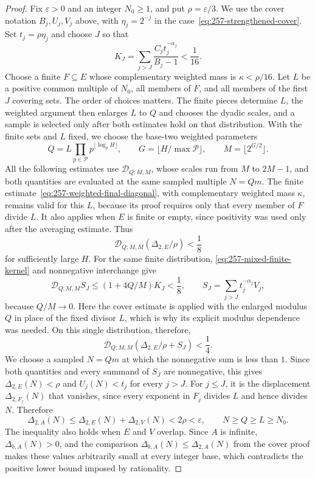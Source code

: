 \documentclass[11pt]{article}
\theoremstyle{plain}
\theoremstyle{definition}
\theoremstyle{remark}
\begin{document}
\begin{proof}
Fix $\varepsilon>0$ and an integer $N_0\ge1$, and put $\rho=\varepsilon/3$.
We use the cover notation $B_j,U_j,V_j$ above, with $\eta_j=2^{-j}$ in
the case~\eqref{eq:257-strengthened-cover}.  Set $t_j=\rho\eta_j$ and choose
$J$ so that
\[
 K_J=\sum_{j>J}\frac{C_jt_j^{-\alpha_j}}{B_j-1}<\frac1{16}.
\]
Choose a finite $F\subseteq E$ whose complementary weighted mass is
$\kappa<\rho/16$.  Let $L$ be a positive common multiple of $N_0$, all
members of $F$, and all members of the first $J$ covering sets. The order
of choices matters. The finite pieces determine $L$, the weighted
argument then enlarges $L$ to $Q$ and chooses the dyadic scales, and a
sample is selected only after both estimates hold on that distribution.
With the finite sets and $L$ fixed, we choose the base-two weighted
parameters
\[
 Q=L\prod_{p\in\mathcal P}p^{\lfloor\log_pH\rfloor},\qquad
 G=\lfloor H/\max\mathcal P\rfloor,\qquad M=\lfloor2^{G/2}\rfloor.
\]
All the following estimates use $\mathscr D_{Q;M,M}$, whose scales run
from $M$ to $2M-1$, and both quantities are evaluated at the same sampled
multiple $N=Qm$.
The finite estimate~\eqref{eq:257-weighted-final-diagonal}, with complementary
weighted mass $\kappa$, remains valid for this $L$, because its proof
requires only that every member of $F$ divide $L$. It also applies when
$E$ is finite or empty, since positivity was used only after the
averaging estimate. Thus
\[
 \mathscr D_{Q;M,M}(\Delta_{2,E}/\rho)<\frac18
\]
for sufficiently large $H$.  For the same finite distribution, \eqref{eq:257-mixed-finite-kernel} and
nonnegative interchange give
\[
 \mathscr D_{Q;M,M}S_J\le(1+4Q/M)K_J<\frac18,
 \qquad S_J=\sum_{j>J}t_j^{-\alpha_j}V_j,
\]
because $Q/M\to0$. Here the cover estimate is applied with the enlarged
modulus $Q$ in place of the fixed divisor $L$, which is why its explicit
modulus dependence was needed. On this single distribution, therefore,
\[
 \mathscr D_{Q;M,M}(\Delta_{2,E}/\rho+S_J)<\frac14.
\]
We choose a sampled $N=Qm$ at which the nonnegative sum is less than $1$.
Since both quantities and every summand of $S_J$ are nonnegative, this
gives
$\Delta_{2,E}(N)<\rho$ and $U_j(N)<t_j$ for every $j>J$.
For $j\le J$, it is the displacement $\Delta_{2,F_j}(N)$ that vanishes,
since every exponent in $F_j$ divides $L$ and hence divides $N$. Therefore
\[
 \Delta_{2,A}(N)\le\Delta_{2,E}(N)+\Delta_{2,V}(N)<2\rho<\varepsilon,
 \qquad N\ge Q\ge L\ge N_0.
\]
The inequality also holds when $E$ and $V$ overlap. Since $A$ is
infinite, $\Delta_{b,A}(N)>0$, and the comparison
$\Delta_{b,A}(N)\le\Delta_{2,A}(N)$ from the cover proof makes these
values arbitrarily small at every integer base, which contradicts the
positive lower bound imposed by rationality.
\end{proof}
\end{document}
